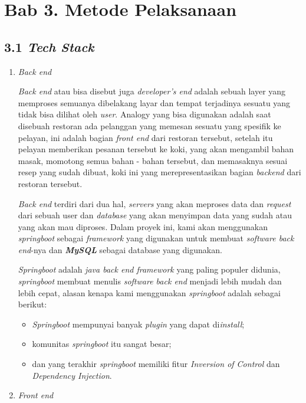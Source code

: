 \documentclass[a4paper]{article}
\begin{document}
\section*{Bab 3. Metode Pelaksanaan}

\subsection*{3.1 \textit{Tech Stack}}
\begin{enumerate}
    \item \textit{Back end} 

    \textit{Back end} atau bisa disebut juga \textit{developer's end} adalah sebuah layer yang memproses semuanya dibelakang layar dan tempat terjadinya sesuatu yang tidak bisa dilihat oleh \textit{user}\autocite{letsgodojo-frontend-backend}. Analogy yang bisa digunakan adalah saat disebuah restoran ada pelanggan yang memesan sesuatu yang spesifik ke pelayan, ini adalah bagian \textit{front end} dari restoran tersebut, setelah itu pelayan memberikan pesanan tersebut ke koki, yang akan mengambil bahan masak, momotong semua bahan - bahan tersebut, dan memasaknya sesuai resep yang sudah dibuat, koki ini yang merepresentasikan bagian \textit{backend} dari restoran tersebut\autocite{codecademy-backend}. 

    \textit{Back end} terdiri dari dua hal, \textit{servers} yang akan meproses data dan \textit{request} dari sebuah user dan \textit{database} yang akan menyimpan data yang sudah atau yang akan mau diproses\autocite{codecademy-backend}. Dalam proyek ini, kami akan menggunakan \textit{springboot} sebagai \textit{framework} yang digunakan untuk membuat \textit{software back end}-nya dan \textit{\textbf{MySQL}} sebagai database yang digunakan.

    \textit{Springboot} adalah \textit{java back end framework} yang paling populer didunia, \textit{springboot} membuat menulis \textit{software back end} menjadi lebih mudah dan lebih cepat\autocite{spring-framework}, alasan kenapa kami menggunakan \textit{springboot} adalah sebagai berikut:
    \begin{itemize}
        \item \textit{Springboot} mempunyai banyak \textit{plugin} yang dapat di\textit{install};
        \item komunitas \textit{springboot} itu sangat besar;
        \item dan yang terakhir \textit{springboot} memiliki fitur \textit{Inversion of Control} dan \textit{Dependency Injection}.
    \end{itemize}

    \item \textit{Front end}
\end{enumerate}
\end{document}
